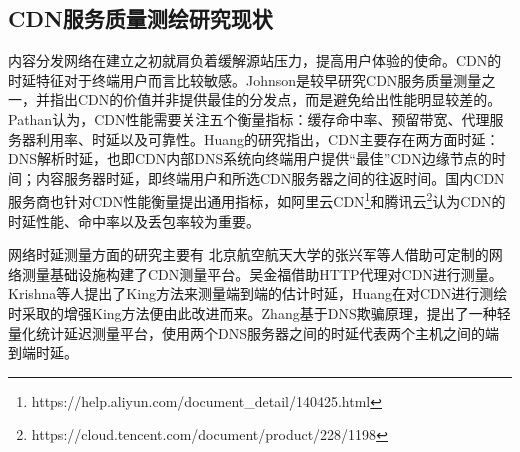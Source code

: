 
\subsection{CDN服务质量测绘研究现状}
 
内容分发网络在建立之初就肩负着缓解源站压力，提高用户体验的使命。CDN的时延特征对于终端用户而言比较敏感。Johnson是较早研究CDN服务质量测量\cite{Johnson-2001-cdn-measure}之一，并指出CDN的价值并非提供最佳的分发点，而是避免给出性能明显较差的。Pathan认为，CDN性能\cite{Pathan-survey-2007}需要关注五个衡量指标：缓存命中率、预留带宽、代理服务器利用率、时延以及可靠性。Huang的研究指出\cite{Huang2008}，CDN主要存在两方面时延：DNS解析时延，也即CDN内部DNS系统向终端用户提供“最佳”CDN边缘节点的时间；内容服务器时延，即终端用户和所选CDN服务器之间的往返时间。国内CDN服务商也针对CDN性能衡量提出通用指标，如阿里云CDN\footnote{https://help.aliyun.com/document\_detail/140425.html}和腾讯云\footnote{https://cloud.tencent.com/document/product/228/1198}认为CDN的时延性能、命中率以及丢包率较为重要。

网络时延测量方面的研究主要有%
北京航空航天大学的张兴军\cite{2005内容分发网络性能测量方法研究与实现}等人借助可定制的网络测量基础设施构建了CDN测量平台。吴金福\cite{吴金福2014中国大陆}借助HTTP代理对CDN进行测量。Krishna等人提出了King\cite{King-2002}方法来测量端到端的估计时延，Huang\cite{Huang2008}在对CDN进行测绘时采取的增强King方法便由此改进而来。Zhang\cite{Zhang-2021-Scale-platform}基于DNS欺骗原理，提出了一种轻量化统计延迟测量平台，使用两个DNS服务器之间的时延代表两个主机之间的端到端时延。%


